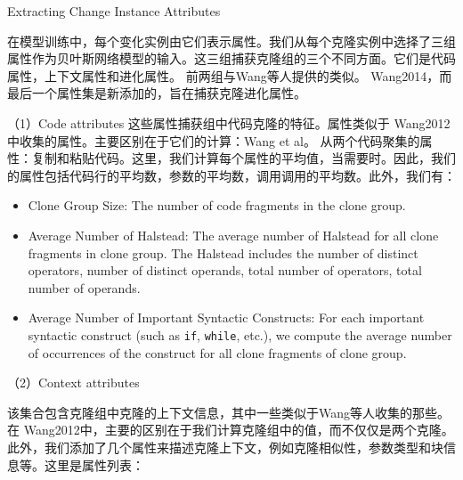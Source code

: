 {Extracting Change Instance Attributes} 

在模型训练中，每个变化实例由它们表示属性。我们从每个克隆实例中选择了三组属性作为贝叶斯网络模型的输入。这三组捕获克隆组的三个不同方面。它们是代码属性，上下文属性和进化属性。
前两组与Wang等人提供的类似。 \cite{} {Wang2014}，而最后一个属性集是新添加的，旨在捕获克隆进化属性。

（1）{Code attributes}
这些属性捕获组中代码克隆的特征。属性类似于\cite{} {Wang2012}中收集的属性。主要区别在于它们的计算：Wang et al。 从两个代码聚集的属性：复制和粘贴代码。这里，我们计算每个属性的平均值，当需要时。因此，我们的属性包括代码行的平均数，参数的平均数，调用调用的平均数。此外，我们有：

\begin{itemize}
\item Clone Group Size: 
The number of code fragments in the clone group.
\item Average Number of Halstead: 
The average number of Halstead for all clone fragments in clone group. The Halstead includes the number of distinct operators, number of distinct operands, total number of operators, total number of operands.
\item Average Number of Important Syntactic Constructs: 
For each important syntactic construct (such as \verb+if+, \verb+while+, etc.), we compute the average number of occurrences of the construct for all clone fragments of clone group.
\end{itemize}

（2）Context attributes

该集合包含克隆组中克隆的上下文信息，其中一些类似于Wang等人收集的那些。 在\cite{} {Wang2012}中，主要的区别在于我们计算克隆组中的值，而不仅仅是两个克隆。此外，我们添加了几个属性来描述克隆上下文，例如克隆相似性，参数类型和块信息等。这里是属性列表：

